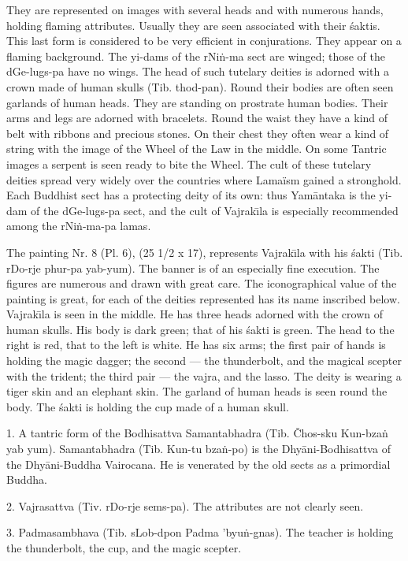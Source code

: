 \documentclass[a4paper, 12pt, oneside]{article}
\begin{document}
They are represented on images with several heads and with numerous hands, holding flaming attributes. Usually they are seen associated with their \'{s}aktis. This last form is considered to be very efficient in conjurations. They appear on a flaming background. The yi-dams of the rNi\.{n}-ma sect are winged; those of the dGe-lugs-pa have no wings. The head of such tutelary deities is adorned with a crown made of human skulls (Tib. thod-pan). Round their bodies are often seen garlands of human heads. They are standing on prostrate human bodies. Their arms and legs are adorned with bracelets. Round the waist they have a kind of belt with ribbons and precious stones. On their chest they often wear a kind of string with the image of the Wheel of the Law in the middle. On some Tantric images a serpent is seen ready to bite the Wheel. The cult of these tutelary deities spread very widely over the countries where Lamaïsm gained a stronghold. Each Buddhist sect has a protecting deity of its own: thus Yam\={a}ntaka is the yi-dam of the dGe-lugs-pa sect, and the cult of Vajrak\={\i}la is especially recommended among the rNi\.{n}-ma-pa lamas.

\bigskip

The painting Nr. 8 (Pl. 6), (25 1/2 x 17), represents Vajrak\={\i}la with his \'{s}akti (Tib. rDo-rje phur-pa yab-yum). The banner is of an especially fine execution. The figures are numerous and drawn with great care. The iconographical value of the painting is great, for each of the deities represented has its name inscribed below. Vajrak\={\i}la is seen in the middle. He has three heads adorned with the crown of human skulls. His body is dark green; that of his \'{s}akti is green. The head to the right is red, that to the left is white. He has six arms; the first pair of hands is holding the magic dagger; the second --- the thunderbolt, and the magical scepter with the trident; the third pair --- the vajra, and the lasso. The deity is wearing a tiger skin and an elephant skin. The garland of human heads is seen round the body. The \'{s}akti is holding the cup made of a human skull.

1. A tantric form of the Bodhisattva Samantabhadra (Tib. Čhos-sku Kun-bza\.{n} yab yum). Samantabhadra (Tib. Kun-tu bza\.{n}-po) is the Dhy\={a}ni-Bodhisattva of the Dhy\={a}ni-Buddha Vairocana. He is venerated by the old sects as a primordial Buddha.

2. Vajrasattva (Tiv. rDo-rje sems-pa). The attributes are not clearly seen.

3. Padmasambhava (Tib. sLob-dpon Padma 'byu\.{n}-gnas). The teacher is holding the thunderbolt, the cup, and the magic scepter.
\end{document}
